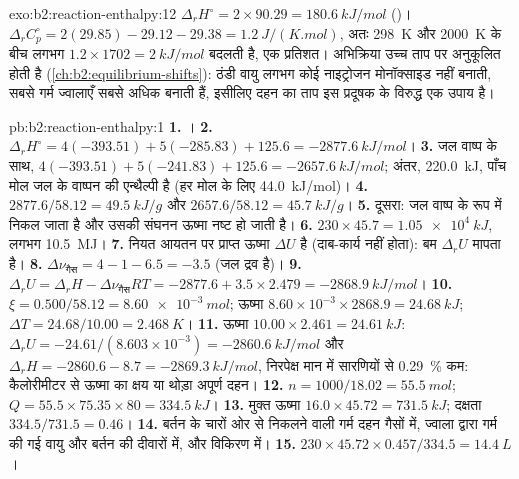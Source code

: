 \begin{solution}{exo:b2:reaction-enthalpy:12}
$\Delta_r H^\circ = 2 \times 90.29 = \qty{+180.6}{kJ/mol}$ ()।
$\Delta_r C_p^\circ = 2(29.85) - 29.12 - 29.38 = \qty{1.2}{J/(K.mol)}$, अतः
\qty{298}{K} और \qty{2000}{K} के बीच  लगभग
$1.2 \times 1702 = \qty{2}{kJ/mol}$ बदलती है, एक प्रतिशत। 
अभिक्रिया उच्च ताप पर अनुकूलित होती है (\cref{ch:b2:equilibrium-shifts}):
ठंडी वायु लगभग कोई नाइट्रोजन मोनॉक्साइड नहीं बनाती, सबसे गर्म ज्वालाएँ
सबसे अधिक बनाती हैं, इसीलिए दहन का ताप इस प्रदूषक के विरुद्ध
एक उपाय है।
\end{solution}

\begin{solution}{pb:b2:reaction-enthalpy:1}
\textbf{1.} ।
\textbf{2.} $\Delta_r H^\circ = 4(-393.51) + 5(-285.83) + 125.6 =
\qty{-2877.6}{kJ/mol}$।
\textbf{3.} जल वाष्प के साथ, $4(-393.51) + 5(-241.83) + 125.6 =
\qty{-2657.6}{kJ/mol}$; अंतर, \qty{220.0}{kJ}, पाँच मोल जल के वाष्पन की
एन्थैल्पी है (हर मोल के लिए \qty{44.0}{kJ/mol})।
\textbf{4.} $2877.6/58.12 = \qty{49.5}{kJ/g}$ और $2657.6/58.12 =
\qty{45.7}{kJ/g}$।
\textbf{5.} दूसरा: जल वाष्प के रूप में निकल जाता है और उसकी संघनन ऊष्मा
नष्ट हो जाती है।
\textbf{6.} $230 \times 45.7 = \qty{1.05e4}{kJ}$, लगभग \qty{10.5}{MJ}।
\textbf{7.} नियत आयतन पर प्राप्त ऊष्मा $\Delta U$ है (दाब-कार्य
नहीं होता): बम $\Delta_r U$ मापता है।
\textbf{8.} $\Delta\nu_{\text{गैस}} = 4 - 1 - 6.5 = -3.5$ (जल
द्रव है)।
\textbf{9.} $\Delta_r U = \Delta_r H - \Delta\nu_{\text{गैस}}RT = -2877.6 +
3.5 \times 2.479 = \qty{-2868.9}{kJ/mol}$।
\textbf{10.} $\xi = 0.500/58.12 = \qty{8.60e-3}{mol}$; ऊष्मा $8.60 \times
10^{-3} \times 2868.9 = \qty{24.68}{kJ}$; $\Delta T = 24.68/10.00 =
\qty{2.468}{K}$।
\textbf{11.} ऊष्मा $10.00 \times 2.461 = \qty{24.61}{kJ}$: $\Delta_r U =
-24.61/(8.603 \times 10^{-3}) = \qty{-2860.6}{kJ/mol}$ और $\Delta_r H =
-2860.6 - 8.7 = \qty{-2869.3}{kJ/mol}$, निरपेक्ष मान में सारणियों से
\qty{0.29}{\percent} कम: कैलोरीमीटर से ऊष्मा का क्षय या थोड़ा
अपूर्ण दहन।
\textbf{12.} $n = 1000/18.02 = \qty{55.5}{mol}$; $Q = 55.5 \times 75.35
\times 80 = \qty{334.5}{kJ}$।
\textbf{13.} मुक्त ऊष्मा $16.0 \times 45.72 = \qty{731.5}{kJ}$; दक्षता
$334.5/731.5 = 0.46$।
\textbf{14.} बर्तन के चारों ओर से निकलने वाली गर्म दहन गैसों में,
ज्वाला द्वारा गर्म की गई वायु और बर्तन की दीवारों में, और विकिरण में।
\textbf{15.} $230 \times 45.72 \times 0.457/334.5 = \qty{14.4}{L}$।

\end{solution}
